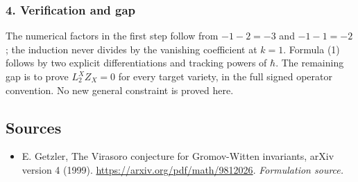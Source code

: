 \documentclass[11pt]{article}
\begin{document}
\subsubsection{4. Verification and gap}
The numerical factors in the first step follow from $-1-2=-3$ and $-1-1=-2$; the induction never divides by the vanishing coefficient at $k=1$. Formula (1) follows by two explicit differentiations and tracking powers of $\hbar$. The remaining gap is to prove $L_2^XZ_X=0$ for every target variety, in the full signed operator convention. No new general constraint is proved here.

\subsection{Sources}
\begin{itemize}
\item[S1]E. Getzler, The Virasoro conjecture for Gromov-Witten invariants, arXiv version 4 (1999).
\url{https://arxiv.org/pdf/math/9812026}.
\textit{Formulation source.}
\end{itemize}
\end{document}
